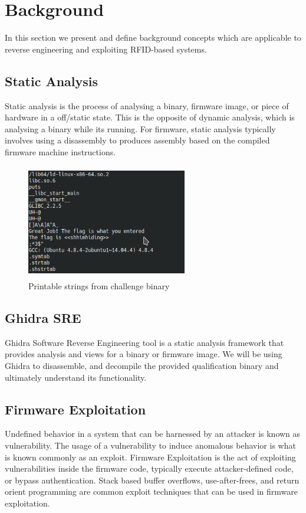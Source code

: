 \documentclass[conference]{IEEEtran}
\begin{document}
\section{Background}
\label{sec:back}
In this section we present and define background concepts which are applicable to reverse engineering and exploiting RFID-based systems.

\subsection{Static Analysis}

Static analysis is the process of analysing a binary, firmware image, or piece of hardware in a off/static state. This is the opposite of dynamic analysis, which is analysing a binary while its running. For firmware, 
static analysis typically involves using a disassembly to produces assembly based on the compiled firmware machine instructions. 

\begin{figure}
    \centering
    \includegraphics[width=7cm, height=5cm]{strings.png}
    \caption{Printable strings from challenge binary}
    \label{fig:my_label}
\end{figure}

\subsection{Ghidra SRE}

Ghidra Software Reverse Engineering\cite{ghidra} tool is a static analysis framework that provides analysis and views for a binary or firmware image. We will be using Ghidra to disassemble, and decompile the provided qualification binary and ultimately understand its functionality. 

\subsection{Firmware Exploitation}

Undefined behavior in a system that can be harnessed by an attacker is known as vulnerability. The usage of a vulnerability to induce anomalous behavior is what is known commonly as an exploit.  Firmware Exploitation is the act of exploiting vulnerabilities inside the firmware code, typically execute attacker-defined code, or bypass authentication. Stack based buffer overflows, use-after-frees, and return orient programming are common exploit techniques that can be used in firmware exploitation.
\end{document}
